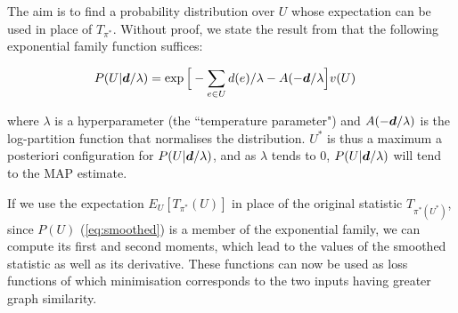 The aim is to find a probability distribution over $U$ whose expectation can be used in place of $T_{\pi^*}$. Without proof, we state the result from \cite{torchtwosample} that the following exponential family function suffices:

\begin{equation}
\label{eq:smoothed}
\begin{split}
P(U | \boldsymbol{d} / \lambda) &= \exp\Big[-\sum_{e \in U} d(e) / \lambda - A(-\boldsymbol{d} / \lambda \Big] v(U)
\end{split}
\end{equation}

where $\lambda$ is a hyperparameter (the ``temperature parameter") and $A(-\boldsymbol{d} / \lambda)$ is the log-partition function  that normalises the distribution. $U^*$ is thus a maximum a posteriori configuration for $P(U | \boldsymbol{d}/\lambda)$, and as $\lambda$ tends to 0,  $P(U | \boldsymbol{d}/\lambda)$ will tend to the MAP estimate. 

If we use the expectation $E_{U}[T_{\pi^*}(U)]$ in place of the original statistic $T_{\pi^*(U^*)}$, since $P(U)$ (\ref{eq:smoothed}) is a member of the exponential family, we can compute its first and second moments, which lead to the values of the smoothed statistic as well as its derivative. These functions can now be used as loss functions of which minimisation corresponds to the two inputs having greater graph similarity. 
